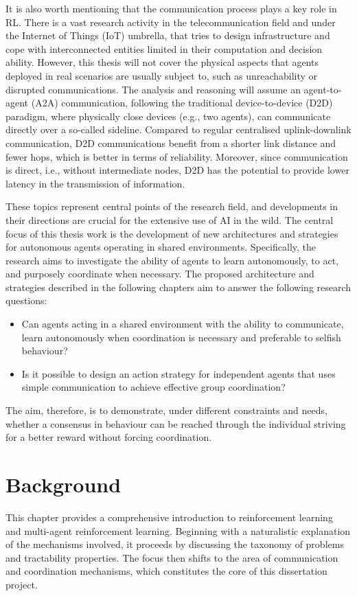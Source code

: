 \documentclass[a4paper,singleside,12pt]{report} %
\begin{document}
It is also worth mentioning that the communication process plays a key role in RL. There is a vast research activity in the telecommunication field and under the Internet of Things (IoT) umbrella, that tries to design infrastructure and cope with interconnected entities limited in their computation and decision ability. However, this thesis will not cover the physical aspects that agents deployed in real scenarios are usually subject to, such as unreachability or disrupted communications. The analysis and reasoning will assume an agent-to-agent (A2A) communication, following the traditional device-to-device (D2D) paradigm, where physically close devices (e.g., two agents), can communicate directly over a so-called sideline. Compared to regular centralised uplink-downlink communication, D2D communications benefit from a shorter link distance and fewer hops, which is better in terms of reliability. Moreover, since communication is direct, i.e., without intermediate nodes, D2D has the potential to provide lower latency in the transmission of information.

These topics represent central points of the research field, and developments in their directions are crucial for the extensive use of AI in the wild. The central focus of this thesis work is the development of new architectures and strategies for autonomous agents operating in shared environments. Specifically, the research aims to investigate the ability of agents to learn autonomously, to act, and purposely coordinate when necessary. The proposed architecture and strategies described in the following chapters aim to answer the following research questions:

\begin{itemize}
\item Can agents acting in a shared environment with the ability to communicate, learn autonomously when coordination is necessary and preferable to selfish behaviour?
\item Is it possible to design an action strategy for independent agents that uses simple communication to achieve effective group coordination?
\end{itemize}

The aim, therefore, is to demonstrate, under different constraints and needs, whether a consensus in behaviour can be reached through the individual striving for a better reward without forcing coordination.


\chapter{Background}\label{background}
This chapter provides a comprehensive introduction to reinforcement learning and multi-agent reinforcement learning. Beginning with a naturalistic explanation of the mechanisms involved, it proceeds by discussing the taxonomy of problems and tractability properties. The focus then shifts to the area of communication and coordination mechanisms, which constitutes the core of this dissertation project.
\end{document}
